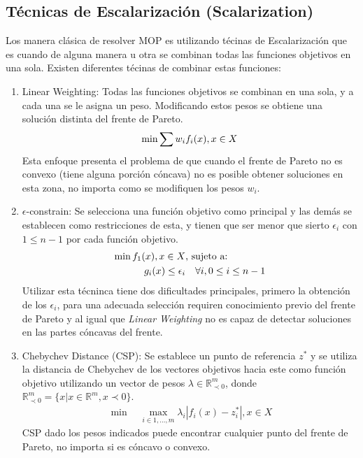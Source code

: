 
\subsection{T\'ecnicas de Escalarizaci\'on (Scalarization)}
Los manera cl\'asica de resolver MOP es utilizando t\'ecinas de Escalarizaci\'on que es cuando de alguna manera u otra se combinan todas las funciones objetivos en una sola. Existen diferentes t\'ecinas de combinar estas funciones:
\begin{enumerate}
    \item Linear Weighting: Todas las funciones objetivos se combinan en una sola, y a cada una se le asigna un peso. Modificando estos pesos se obtiene una soluci\'on distinta del frente de Pareto.
    \begin{equation*}
        \min \sum w_i f_i(x), \space x \in X
    \end{equation*}
    Esta enfoque presenta el problema de que cuando el frente de Pareto no es convexo (tiene alguna porci\'on c\'oncava) no es posible obtener soluciones en esta zona, no importa como se modifiquen los pesos $w_i$.

    \item $\epsilon$-constrain: Se selecciona una funci\'on objetivo como principal y las dem\'as se establecen como restricciones de esta, y tienen que ser menor que sierto $\epsilon_i$ con $1 \leq n - 1$ por cada funci\'on objetivo.
    \begin{align*}
            \min  f_1(x), \space x \in X  & \text{, sujeto a:}   \\
            g_i(x) \leq \epsilon_i & \quad  \forall i, 0 \leq i \leq n - 1
    \end{align*}
    Utilizar esta t\'ecninca tiene dos dificultades principales, primero la obtenci\'on de los $\epsilon_i$, para una adecuada selecci\'on requiren conocimiento previo del frente de Pareto y al igual que \textit{Linear Weighting} no es capaz de detectar soluciones en las partes c\'oncavas del frente.

\item Chebychev Distance (CSP): Se establece un punto de referencia $z^*$ y se utiliza la distancia de Chebychev de los vectores objetivos hacia este como funci\'on objetivo utilizando un vector de pesos $\lambda \in \mathbb{R}^m_{\prec 0}$, donde $\mathbb{R}^m_{\prec 0} = \{x | x \in \mathbb{R}^m, x \prec 0 \}$. 
    \begin{align*}
        \min \quad \max_{i \in {1,...,m}} \lambda_i |f_i(x) - z^*_i|, x \in X 
    \end{align*}
    CSP dado los pesos indicados puede encontrar cualquier punto del frente de Pareto, no importa si es c\'oncavo o convexo.

\end{enumerate}

